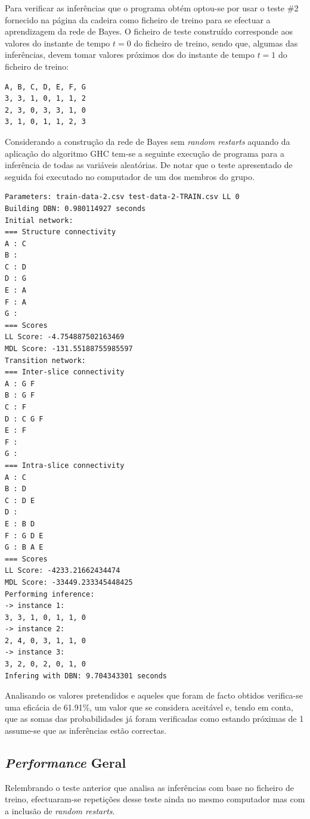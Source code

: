 \documentclass[10pt]{article}
\numberwithin{equation}{section}
\begin{document}
Para verificar as inferências que o programa obtém optou-se por usar o teste \#2 fornecido na página da cadeira como ficheiro de treino para se efectuar a aprendizagem da rede de Bayes. O ficheiro de teste construído corresponde aos valores do instante de tempo $t = 0$ do ficheiro de treino, sendo que, algumas das inferências, devem tomar valores próximos dos do instante de tempo $t = 1$ do ficheiro de treino:

\begin{lstlisting}
A, B, C, D, E, F, G
3, 3, 1, 0, 1, 1, 2
2, 3, 0, 3, 3, 1, 0
3, 1, 0, 1, 1, 2, 3
\end{lstlisting}

Considerando a construção da rede de Bayes sem \textit{random restarts} aquando da aplicação do algoritmo GHC tem-se a seguinte execução de programa para a inferência de todas as variáveis aleatórias. De notar que o teste apresentado de seguida foi executado no computador de um dos membros do grupo.

\begin{lstlisting}
Parameters: train-data-2.csv test-data-2-TRAIN.csv LL 0
Building DBN: 0.980114927 seconds
Initial network: 
=== Structure connectivity
A : C 
B : 
C : D 
D : G 
E : A 
F : A 
G : 
=== Scores
LL Score: -4.754887502163469
MDL Score: -131.55188755985597
Transition network: 
=== Inter-slice connectivity
A : G F 
B : G F 
C : F 
D : C G F 
E : F 
F : 
G : 
=== Intra-slice connectivity
A : C 
B : D 
C : D E 
D : 
E : B D 
F : G D E 
G : B A E 
=== Scores
LL Score: -4233.21662434474
MDL Score: -33449.233345448425
Performing inference:
-> instance 1: 
3, 3, 1, 0, 1, 1, 0
-> instance 2: 
2, 4, 0, 3, 1, 1, 0
-> instance 3: 
3, 2, 0, 2, 0, 1, 0
Infering with DBN: 9.704343301 seconds
\end{lstlisting}

Analisando os valores pretendidos e aqueles que foram de facto obtidos verifica-se uma eficácia de 61.91\%, um valor que se considera aceitável e, tendo em conta, que as somas das probabilidades já foram verificadas como estando próximas de 1 assume-se que as inferências estão correctas.

\subsection{\textit{Performance} Geral}

Relembrando o teste anterior que analisa as inferências com base no ficheiro de treino, efectuaram-se repetições desse teste ainda no mesmo computador mas com a inclusão de \textit{random restarts}.
\end{document}
